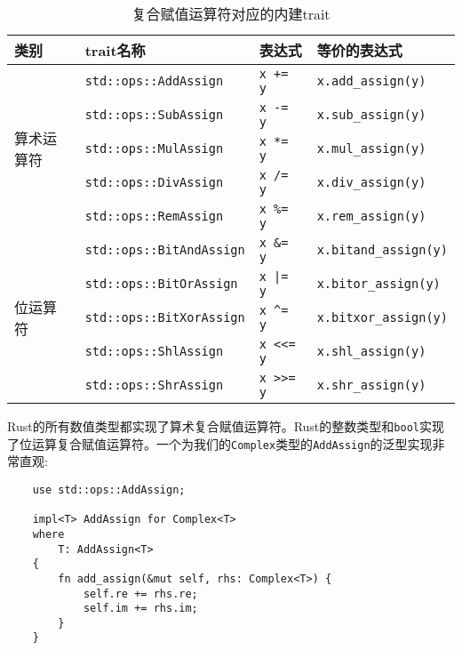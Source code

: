 \begin{table}[htbp]
    \centering
    \caption{复合赋值运算符对应的内建trait}
    \label{t12-4}
    \begin{tabular}{llll}
        \hline
        \textbf{类别}   & \textbf{trait名称}    & \textbf{表达式}   & \textbf{等价的表达式} \\
        \hline

        \multirow{5}{*}{算术运算符} & \texttt{std::ops::AddAssign}    & \texttt{x += y}    & \texttt{x.add\_assign(y)} \\
        & \texttt{std::ops::SubAssign} \cellcolor{tablecolor} & \texttt{x -= y} \cellcolor{tablecolor} & \texttt{x.sub\_assign(y)} \cellcolor{tablecolor}  \\
        & \texttt{std::ops::MulAssign}    & \texttt{x *= y}    & \texttt{x.mul\_assign(y)} \\
        & \texttt{std::ops::DivAssign} \cellcolor{tablecolor} & \texttt{x /= y} \cellcolor{tablecolor} & \texttt{x.div\_assign(y)} \cellcolor{tablecolor}  \\
        & \texttt{std::ops::RemAssign}    & \texttt{x \%= y}   & \texttt{x.rem\_assign(y)} \\

        \hline

        \multirow{5}{*}{位运算符}   & \texttt{std::ops::BitAndAssign} \cellcolor{tablecolor}  & \texttt{x \&= y} \cellcolor{tablecolor}    & \texttt{x.bitand\_assign(y)} \cellcolor{tablecolor}   \\
        & \texttt{std::ops::BitOrAssign}  & \texttt{x |= y}    & \texttt{x.bitor\_assign(y)}   \\
        & \texttt{std::ops::BitXorAssign} \cellcolor{tablecolor} & \texttt{x \^{}= y} \cellcolor{tablecolor}   & \texttt{x.bitxor\_assign(y)} \cellcolor{tablecolor}   \\
        & \texttt{std::ops::ShlAssign}    & \texttt{x <<= y}   & \texttt{x.shl\_assign(y)} \\
        & \texttt{std::ops::ShrAssign} \cellcolor{tablecolor} & \texttt{x >>= y} \cellcolor{tablecolor}    & \texttt{x.shr\_assign(y)} \cellcolor{tablecolor}  \\
    \end{tabular}
\end{table}

Rust的所有数值类型都实现了算术复合赋值运算符。Rust的整数类型和\texttt{bool}实现了位运算复合赋值运算符。一个为我们的\texttt{Complex}类型的\texttt{AddAssign}的泛型实现非常直观:
\begin{verbatim}
    use std::ops::AddAssign;

    impl<T> AddAssign for Complex<T>
    where
        T: AddAssign<T>
    {
        fn add_assign(&mut self, rhs: Complex<T>) {
            self.re += rhs.re;
            self.im += rhs.im;
        }
    }
\end{verbatim}

